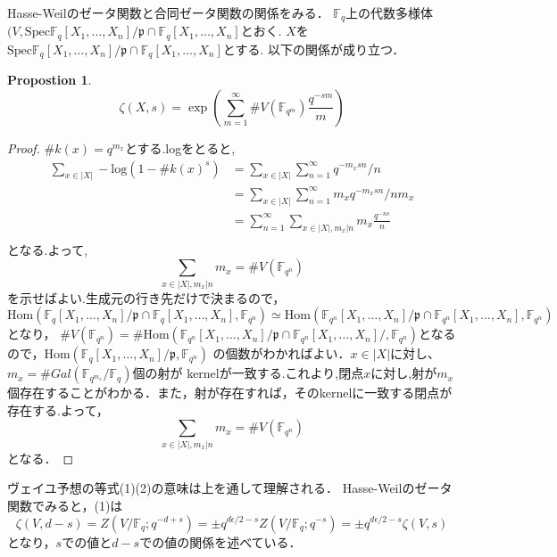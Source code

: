 \documentclass{ujarticle}
\newtheorem{prop}[thm]{Propostion}
\begin{document}
Hasse-Weilのゼータ関数と合同ゼータ関数の関係をみる．
$\mathbb{F}_q$上の代数多様体$(V,\mathrm{Spec}\mathbb{F}_q[X_1,\dots,X_n]/\mathfrak{p}\cap \mathbb{F}_q[X_1,\dots,X_n]$とおく.
$X$を$\mathrm{Spec}\mathbb{F}_q[X_1,\dots,X_n]/\mathfrak{p}\cap \mathbb{F}_q[X_1,\dots,X_n]$とする.
以下の関係が成り立つ．
\begin{prop}
  \begin{equation*}
   \zeta(X,s)=\exp(\sum_{m=1}^{\infty}\#V(\mathbb{F}_{q^m}) \frac{q^{-sm}}{m})
  \end{equation*}
\end{prop}
\begin{proof}
  $\#k(x)=q^{m_x}$とする.logをとると,
  \begin{align*}
    \sum_{x \in |X|} -\mathrm{log}(1-\#k(x)^s) &=
    \sum_{x \in |X|}\sum_{n=1}^{\infty} q^{-m_xsn}/n \\
    & = \sum_{x \in |X|}\sum_{n=1}^{\infty} m_xq^{-m_xsn}/nm_x \\
    & = \sum_{n=1}^{\infty}\sum_{x\in |X|, m_x|n}m_x \frac{q^{-ns}}{n} \\
  \end{align*}
  となる.よって,
  \begin{equation*}
   \sum_{x\in |X|, m_x|n}m_x = \#V(\mathbb{F}_{q^n})
  \end{equation*}
  を示せばよい.生成元の行き先だけで決まるので，$\mathrm{Hom}(\mathbb{F}_q[X_1,\dots,X_n]/\mathfrak{p} \cap \mathbb{F}_q[X_1,\dots,X_n],\mathbb{F}_{q^n})
  \simeq \mathrm{Hom}(\mathbb{F}_{q^n}[X_1,\dots,X_n]/\mathfrak{p}\cap\mathbb{F}_{q^n}[X_1,\dots,X_n],\mathbb{F}_{q^n})$
  となり， $\#V(\mathbb{F}_{q^n})=\#\mathrm{Hom}(\mathbb{F}_{q^n}[X_1,\dots,X_n]/\mathfrak{p}\cap \mathbb{F}_{q^n}[X_1,\dots,X_n]/,\mathbb{F}_{q^n})$となるので，$\mathrm{Hom}(\mathbb{F}_q[X_1,\dots,X_n]/\mathfrak{p},\mathbb{F}_{q^n})$
  の個数がわかればよい．$x \in |X|$に対し、$m_x=\#Gal(\mathbb{F}_{q^{m_x}}/\mathbb{F}_q)$個の射が
  kernelが一致する.これより,閉点$x$に対し,射が$m_x$個存在することがわかる．また，射が存在すれば，そのkernelに一致する閉点が存在する.よって，
  \begin{equation*}
   \sum_{x\in |X|, m_x|n}m_x = \#V(\mathbb{F}_{q^n})
  \end{equation*}
  となる．
\end{proof}
ヴェイユ予想の等式(1)(2)の意味は上を通して理解される．
Hasse-Weilのゼータ関数でみると，(1)は
\begin{equation*}
 \zeta(V,d-s)=Z(V/\mathbb{F}_q;q^{-d+s})=\pm q^{d \epsilon/2 -s}Z(V/\mathbb{F}_q;q^{-s})
 = \pm q^{d \epsilon/2 -s} \zeta(V,s)
\end{equation*}
となり，$s$での値と$d-s$での値の関係を述べている．
\end{document}
